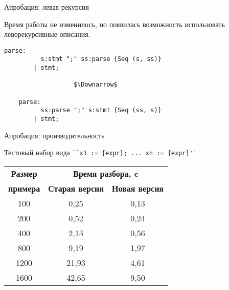 \documentclass[10pt, mathserif]{beamer}
\let\\\tabularnewline
\let\\\tabularnewline
\theoremstyle{definition}
\begin{document}
\begin{frame}[fragile]{Апробация: левая рекурсия}

  Время работы не изменилось, но появилась возможность использовать леворекурсивные описания.
  \vskip3mm
  \begin{lstlisting}[basicstyle=\small]
    parse:
          s:stmt ";" ss:parse {Seq (s, ss)}
        | stmt;

                   $\Downarrow$

    parse:
          ss:parse ";" s:stmt {Seq (ss, s)}
        | stmt;

  \end{lstlisting}

\end{frame}

\begin{frame}[fragile]{Апробация: производительность}

Тестовый набор вида \lstinline|``x1 := {expr}; ... xn := {expr}''|
\vskip3mm

  \begin{table}[htbp]
  \begin{center}
  \begin{tabular}{|c|c|c|}
  \hline
  \textbf{Размер} & \multicolumn{2}{|c|}{\textbf{Время разбора, c}} \\
  \cline{2-3}
  \textbf{примера} & \textbf{Старая версия} & \textbf{Новая версия} \\
  \hline
  100& 0,25& 0,13 \\
  \hline
  200& 0,52& 0,24 \\
  \hline
  400& 2,13& 0,56 \\
  \hline
  800& 9,19& 1,97 \\
  \hline
  1200& 21,93& 4,61 \\
  \hline
  1600& 42,65& 9,50 \\
  \hline
  \end{tabular}
  \vskip3mm
  \label{tab1}
  \end{center}\vspace{-10mm}
  \end{table}

\end{frame}
\end{document}
